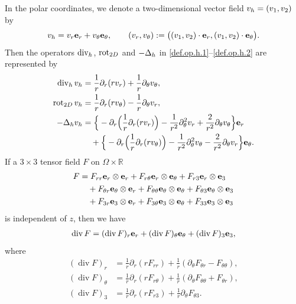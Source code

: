 \documentclass[11pt,a4paper]{article}
\numberwithin{equation}{section}
\newcommand{\R}{\mathbb{R}}
\newcommand{\opdiv}{\operatorname{div}}
\newcommand{\oprot}{\operatorname{rot}}
\newcommand{\h}{{\rm h}}
\begin{document}
In the polar coordinates, we denote a two-dimensional vector field $v_\h=(v_1,v_2)$ by 
\[
v_\h 
= v_r {\bf e}_r 
+ v_\theta {\bf e}_\theta, 
\qquad
(v_r, v_\theta)
:=
\big(
(v_1,v_2)\cdot {\bf e}_r, 
(v_1,v_2)\cdot {\bf e}_\theta 
\big). 
\]
Then the operators 
$\opdiv_\h$, $\oprot_{{\rm 2D}}$ and $-\Delta_\h$ in \eqref{def.op.h.1}--\eqref{def.op.h.2} are represented by 
%
\begin{align}\label{formulas.polar}
\begin{split}
\opdiv_\h v_\h
& = \frac1r \partial_r (r v_r) + \frac1r \partial_\theta v_\theta, \\
\oprot_{{\rm 2D}} v_\h 
& = \frac1r \partial_r (r v_\theta) - \frac1r \partial_\theta v_r,  \\
-\Delta_\h v_\h 
& = \Big\{ -\partial_r \Big( \frac1r \partial_r (r v_r ) \Big)  
- \frac{1}{r^2} \partial_\theta^2 v_r 
+ \frac{2}{r^2} \partial_\theta v_\theta \Big\} {\bf e}_r \\
&\quad
+  \Big\{ - \partial_r \Big( \frac1r \partial_r (r v_\theta) \Big) 
- \frac{1}{r^2} \partial_\theta^2 v_\theta 
- \frac{2}{r^2} \partial_\theta v_r \Big\} {\bf e}_\theta.
\end{split}
\end{align}
%
If a $3\times3$ tensor field $F$ on $\Omega\times\R$ 
%
\begin{align*}
F 
&= 
F_{r r} {\bf e}_r\otimes {\bf e}_r 
+ F_{r \theta} {\bf e}_r\otimes {\bf e}_\theta
+ F_{r 3} {\bf e}_r\otimes {\bf e}_3 \\
&\quad
+ F_{\theta r} {\bf e}_\theta\otimes {\bf e}_r 
+ F_{\theta \theta} {\bf e}_\theta\otimes {\bf e}_\theta 
+ F_{\theta 3} {\bf e}_\theta\otimes {\bf e}_3 \\
&\quad
+ F_{3 r} {\bf e}_3\otimes {\bf e}_r 
+ F_{3 \theta} {\bf e}_3\otimes {\bf e}_\theta 
+ F_{3 3} {\bf e}_3\otimes {\bf e}_3 
\end{align*}
%
is independent of $z$, then we have 
%
\begin{align}\label{def.divF}
\opdiv  F 
= (\opdiv  F)_r {\bf e}_r 
+ (\opdiv  F)_\theta {\bf e}_\theta 
+ (\opdiv  F)_3 {\bf e}_3, 
\end{align}
%
where
%
\begin{align*}
(\opdiv  F)_r 
&= 
\frac{1}{r} \partial_r (r F_{r r}) 
+ \frac{1}{r} (\partial_\theta F_{\theta r} - F_{\theta \theta}), \\
(\opdiv  F)_\theta 
&= 
\frac{1}{r} \partial_r (r F_{r \theta}) 
+ \frac{1}{r} (\partial_\theta F_{\theta \theta} + F_{\theta r}), \\
(\opdiv  F)_3 
&= 
\frac{1}{r} \partial_r (r F_{r 3}) 
+ \frac{1}{r} \partial_\theta F_{\theta 3}. 
\end{align*}
\end{document}
